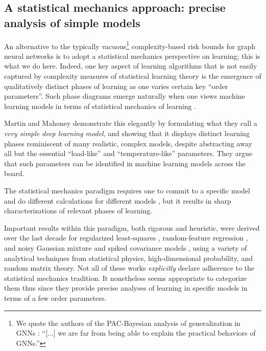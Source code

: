 \documentclass[9pt,twocolumn]{pnas-new}
\newcommand{\idd}[1]{{#1}}
\begin{document}
\subsection*{A statistical mechanics approach: precise analysis of simple models}

\idd{
An alternative to the typically vacuous\footnote{We quote the authors of the PAC-Bayesian analysis of generalization in GNNs \cite{liao2021a}: ``[...] we are far from being able to explain the practical behaviors of GNNs.''} complexity-based risk bounds for graph neural networks \cite{garg2020generalization,liao2021a,esser2021learning} is to adopt a statistical mechanics perspective on learning; this is what we do here. Indeed, one key aspect of learning algorithms that is not easily captured by complexity measures of statistical learning theory is the emergence of qualitatively distinct phases of learning as one varies certain key ``order parameters''. Such phase diagrams emerge naturally when one views machine learning models in terms of statistical mechanics of learning \cite{yang2021taxonomizing,martin2017rethinking}. 

Martin and Mahoney \cite{martin2017rethinking} demonstrate this elegantly by formulating what they call a \emph{very simple deep learning model}, and showing that it displays distinct learning phases reminiscent of many realistic, complex models, despite abstracting away all but the essential ``load-like'' and ``temperature-like'' parameters. They argue that such parameters can be identified in machine learning models across the board.

The statistical mechanics paradigm requires one to commit to a specific model and do different calculations for different models \cite{watkin1993statistical}, but it results in sharp characterizations of relevant phases of learning. 

Important results within this paradigm, both rigorous and heuristic, were derived over the last decade for regularized least-squares \cite{oymak2013squared, thrampoulidis2018precise,boyd2011distributed}, random-feature regression \cite{belkin2020two,liao2020random, hu2022universality, mei2022generalization}, and noisy Gaussian mixture and spiked covariance models \cite{el2018detection, macris2020all, mignacco2020role}, using a variety of analytical techniques from statistical physics, high-dimensional probability, and random matrix theory. Not all of these works \emph{explicitly} declare adherence to the statistical mechanics tradition. It nonetheless seems appropriate to categorize them thus since they provide precise analyses of learning in specific models in terms of a few order parameters.}
\end{document}

